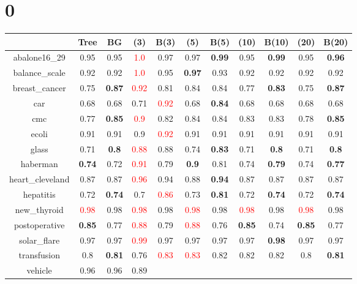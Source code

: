 \documentclass{article}%
\begin{document}
%
\normalsize%
\section*{0}%
\begin{tabular}{c|cccccccccc}%
\hline%
&Tree&BG&(3)&B(3)&(5)&B(5)&(10)&B(10)&(20)&B(20)\\%
\hline%
abalone16\_29&0.95&0.95&\textcolor{red}{ 
1.0
}&0.97&0.97&\textbf{0.99}&0.95&\textbf{0.99}&0.95&\textbf{0.96}\\%
\hline%
balance\_scale&0.92&0.92&\textcolor{red}{ 
1.0
}&0.95&\textbf{0.97}&0.93&0.92&0.92&0.92&0.92\\%
\hline%
breast\_cancer&0.75&\textbf{0.87}&\textcolor{red}{ 
0.92
}&0.81&0.84&0.84&0.77&\textbf{0.83}&0.75&\textbf{0.87}\\%
\hline%
car&0.68&0.68&0.71&\textcolor{red}{ 
0.92
}&0.68&\textbf{0.84}&0.68&0.68&0.68&0.68\\%
\hline%
cmc&0.77&\textbf{0.85}&\textcolor{red}{ 
0.9
}&0.82&0.84&0.84&0.83&0.83&0.78&\textbf{0.85}\\%
\hline%
ecoli&0.91&0.91&0.9&\textcolor{red}{ 
0.92
}&0.91&0.91&0.91&0.91&0.91&0.91\\%
\hline%
glass&0.71&\textbf{0.8}&\textcolor{red}{ 
0.88
}&0.88&0.74&\textbf{0.83}&0.71&\textbf{0.8}&0.71&\textbf{0.8}\\%
\hline%
haberman&\textbf{0.74}&0.72&\textcolor{red}{ 
0.91
}&0.79&\textbf{0.9}&0.81&0.74&\textbf{0.79}&0.74&\textbf{0.77}\\%
\hline%
heart\_cleveland&0.87&0.87&\textcolor{red}{ 
0.96
}&0.94&0.88&\textbf{0.94}&0.87&0.87&0.87&0.87\\%
\hline%
hepatitis&0.72&\textbf{0.74}&0.7&\textcolor{red}{ 
0.86
}&0.73&\textbf{0.81}&0.72&\textbf{0.74}&0.72&\textbf{0.74}\\%
\hline%
new\_thyroid&\textcolor{red}{ 
0.98
}&0.98&\textcolor{red}{ 
0.98
}&0.98&\textcolor{red}{ 
0.98
}&0.98&\textcolor{red}{ 
0.98
}&0.98&\textcolor{red}{ 
0.98
}&0.98\\%
\hline%
postoperative&\textbf{0.85}&0.77&\textcolor{red}{ 
0.88
}&0.79&\textcolor{red}{ 
0.88
}&0.76&\textbf{0.85}&0.74&\textbf{0.85}&0.77\\%
\hline%
solar\_flare&0.97&0.97&\textcolor{red}{ 
0.99
}&0.97&0.97&0.97&0.97&\textbf{0.98}&0.97&0.97\\%
\hline%
transfusion&0.8&\textbf{0.81}&0.76&\textcolor{red}{ 
0.83
}&\textcolor{red}{ 
0.83
}&0.82&0.82&0.82&0.8&\textbf{0.81}\\%
\hline%
vehicle&0.96&0.96&0.89&\textcolor{red}{ 
}
\end{tabular}
\end{document}
